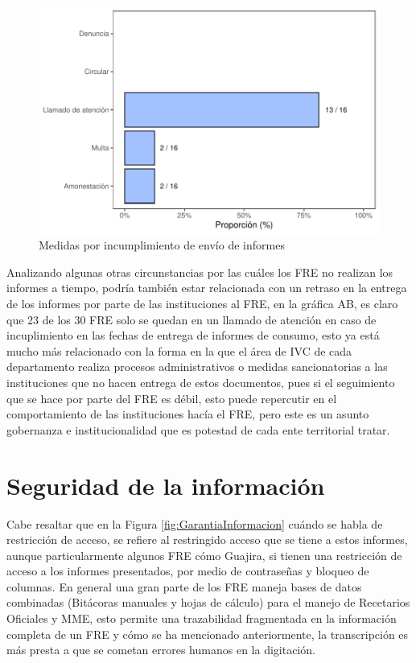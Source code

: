 \documentclass[
]{book}
\begin{document}
\begin{figure}
\includegraphics[width=0.85\linewidth]{InformeFinal_files/figure-latex/IncumplimientoEnvioInformes-1} \caption{Medidas por incumplimiento de envío de informes}\label{fig:IncumplimientoEnvioInformes}
\end{figure}

Analizando algunas otras circunstancias por las cuáles los FRE no realizan los informes a tiempo, podría también estar relacionada con un retraso en la entrega de los informes por parte de las instituciones al FRE, en la gráfica AB, es claro que 23 de los 30 FRE solo se quedan en un llamado de atención en caso de incuplimiento en las fechas de entrega de informes de consumo, esto ya está mucho más relacionado con la forma en la que el área de IVC de cada departamento realiza procesos administrativos o medidas sancionatorias a las instituciones que no hacen entrega de estos documentos, pues si el seguimiento que se hace por parte del FRE es débil, esto puede repercutir en el comportamiento de las instituciones hacía el FRE, pero este es un asunto gobernanza e institucionalidad que es potestad de cada ente territorial tratar.

\hypertarget{seguridad-de-la-informaciuxf3n}{%
\section{Seguridad de la información}\label{seguridad-de-la-informaciuxf3n}}

Cabe resaltar que en la Figura \ref{fig:GarantiaInformacion} cuándo se habla de restricción de acceso, se refiere al restringido acceso que se tiene a estos informes, aunque particularmente algunos FRE cómo Guajira, si tienen una restricción de acceso a los informes presentados, por medio de contraseñas y bloqueo de columnas. En general una gran parte de los FRE maneja bases de datos combinadas (Bitácoras manuales y hojas de cálculo) para el manejo de Recetarios Oficiales y MME, esto permite una trazabilidad fragmentada en la información completa de un FRE y cómo se ha mencionado anteriormente, la transcripción es más presta a que se cometan errores humanos en la digitación.
\end{document}
